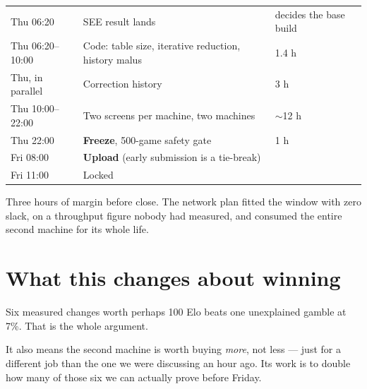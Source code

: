 \documentclass[11pt,a4paper]{article}
\begin{document}
\begin{center}
\begin{tabular}{lll}
\toprule
Thu 06:20 & SEE result lands & decides the base build \\
Thu 06:20--10:00 & Code: table size, iterative reduction, history malus & 1.4 h \\
Thu, in parallel & Correction history & 3 h \\
Thu 10:00--22:00 & Two screens per machine, two machines & $\sim$12 h \\
Thu 22:00 & \textbf{Freeze}, 500-game safety gate & 1 h \\
Fri 08:00 & \textbf{Upload} (early submission is a tie-break) & \\
Fri 11:00 & Locked & \\
\bottomrule
\end{tabular}
\end{center}

Three hours of margin before close. The network plan fitted the window with zero slack, on a
throughput figure nobody had measured, and consumed the entire second machine for its whole life.

\section{What this changes about winning}

Six measured changes worth perhaps 100 Elo beats one unexplained gamble at 7\%. That is the whole
argument.

It also means the second machine is worth buying \emph{more}, not less --- just for a different
job than the one we were discussing an hour ago. Its work is to double how many of those six we
can actually prove before Friday.
\end{document}
